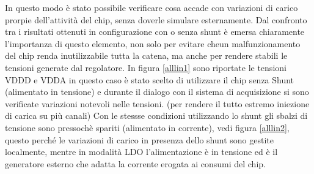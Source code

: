 In questo modo è stato possibile verificare cosa accade con variazioni di carico prorpie dell'attività del chip, senza doverle simulare esternamente. 
Dal confronto tra i risultati ottenuti in configurazione con o senza shunt è emersa chiaramente l'importanza di questo elemento, non solo per evitare cheun malfunzionamento del chip renda inutilizzabile tutta la catena, ma anche per rendere stabili le tensioni generate dal regolatore. 
In figura \ref{alllin1} sono riportate le tensioni VDDD e VDDA in questo caso è stato scelto di utilizzare il chip senza Shunt (alimentato in tensione) e durante il dialogo con il sistema di acquisizione si sono verificate variazioni notevoli nelle tensioni. (per rendere il tutto estremo iniezione di carica su più canali) Con le stessse condizioni utilizzando lo shunt gli sbalzi di tensione sono pressochè spariti (alimentato in corrente), vedi figura \ref{alllin2}, questo perché le variazioni di carico in presenza dello shunt sono gestite localmente, mentre in modalità LDO l'alimentazione è in tensione ed è il generatore esterno che adatta la corrente erogata ai consumi del chip.


